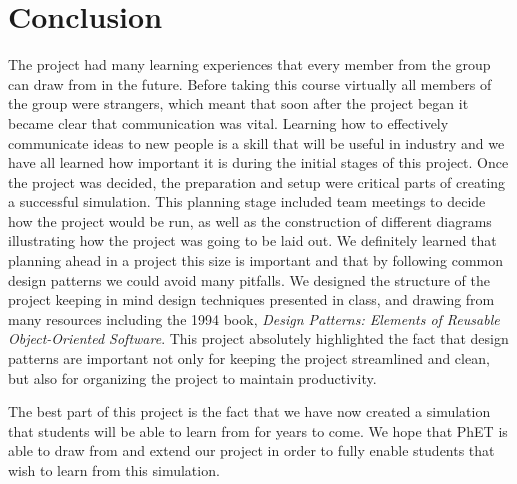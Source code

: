 \section{Conclusion}

The project had many learning experiences that every member from the group can draw from in the
future. Before taking this course virtually all members of the group were strangers, which meant
that soon after the project began it became clear that communication was vital. Learning how to
effectively communicate ideas to new people is a skill that will be useful in industry and we have
all learned how important it is during the initial stages of this project. Once the project was
decided, the preparation and setup were critical parts of creating a successful simulation. This
planning stage included team meetings to decide how the project would be run, as well as the
construction of different diagrams illustrating how the project was going to be laid out. We
definitely learned that planning ahead in a project this size is important and that by following
common design patterns we could avoid many pitfalls. We designed the structure of the project
keeping in mind design techniques presented in class, and drawing from many resources including the
1994 book, \textit{Design Patterns: Elements of Reusable Object-Oriented Software}. This project
absolutely highlighted the fact that design patterns are important not only for keeping the project
streamlined and clean, but also for organizing the project to maintain productivity.

The best part of this project is the fact that we have now created a simulation that students will
be able to learn from for years to come. We hope that PhET is able to draw from and extend our
project in order to fully enable students that wish to learn from this simulation.
